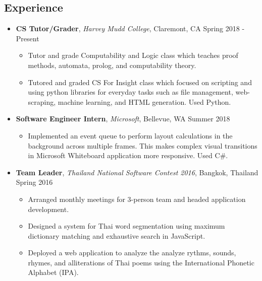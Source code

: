 \documentclass[10.5pt,letterpaper]{article}
\begin{document}
\subsection*{Experience}
  \begin{itemize}
    \parskip=-0.2em

    \item[]
    {\textbf{CS Tutor/Grader}, \textit{Harvey Mudd College}, Claremont, CA \hfill {Spring 2018 - Present}}
    \begin{itemize}[label=\textbullet]
      \itemsep0.1em
      \item Tutor and grade Computability and Logic class which teaches proof methods, automata, prolog,
      and computability theory. 
      \item Tutored and graded CS For Insight class which focused 
      on scripting and using python libraries for everyday tasks such as file management, web-scraping, 
      machine learning, and HTML generation. Used Python.
    \end{itemize}
    
    \item[]
    {\textbf{Software Engineer Intern}, \textit{Microsoft}, Bellevue, WA \hfill {Summer 2018}}
    \begin{itemize}[label=\textbullet]
      \itemsep0.1em
      \item Implemented an event queue to perform layout calculations in the background 
      across multiple frames. This makes complex visual transitions in Microsoft Whiteboard application
      more responsive. Used C\#.
    \end{itemize}
    
    \item[]
    {\textbf{Team Leader}, \textit{Thailand National Software Contest 2016}, Bangkok, Thailand \hfill {Spring 2016}}
    \begin{itemize}[label=\textbullet]
      \itemsep0.1em
      \item Arranged monthly meetings for 3-person team and headed application development.
      \item Designed a system for Thai word segmentation using maximum dictionary matching and exhaustive 
      search in JavaScript.
      \item Deployed a web application to analyze the analyze rythms, sounds, rhymes, and alliterations of Thai 
      poems using the International Phonetic Alphabet (IPA).
      
    \end{itemize}
    

\end{itemize}
\end{document}

